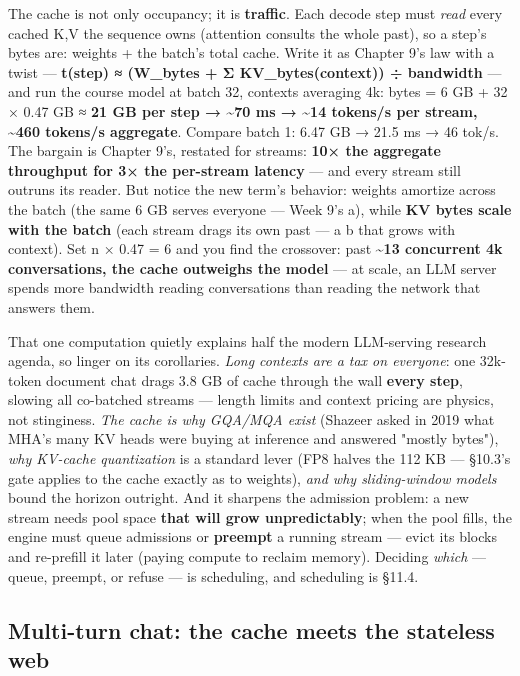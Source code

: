 The cache is not only occupancy; it is \textbf{traffic}. Each decode step must \textit{read} every cached K,V the sequence owns (attention consults the whole past), so a step's bytes are: weights + the batch's total cache. Write it as Chapter 9's law with a twist — \textbf{t(step) ≈ (W\_bytes + Σ KV\_bytes(context)) ÷ bandwidth} — and run the course model at batch 32, contexts averaging 4k: bytes = 6 GB + 32 × 0.47 GB ≈ \textbf{21 GB per step → \textasciitilde{}70 ms → \textasciitilde{}14 tokens/s per stream, \textasciitilde{}460 tokens/s aggregate}. Compare batch 1: 6.47 GB → 21.5 ms → 46 tok/s. The bargain is Chapter 9's, restated for streams: \textbf{10× the aggregate throughput for 3× the per-stream latency} — and every stream still outruns its reader. But notice the new term's behavior: weights amortize across the batch (the same 6 GB serves everyone — Week 9's a), while \textbf{KV bytes scale with the batch} (each stream drags its own past — a b that grows with context). Set n × 0.47 = 6 and you find the crossover: past \textbf{\textasciitilde{}13 concurrent 4k conversations, the cache outweighs the model} — at scale, an LLM server spends more bandwidth reading conversations than reading the network that answers them.

That one computation quietly explains half the modern LLM-serving research agenda, so linger on its corollaries. \textit{Long contexts are a tax on everyone}: one 32k-token document chat drags 3.8 GB of cache through the wall \textbf{every step}, slowing all co-batched streams — length limits and context pricing are physics, not stinginess. \textit{The cache is why GQA/MQA exist} (Shazeer asked in 2019 what MHA's many KV heads were buying at inference and answered "mostly bytes"), \textit{why KV-cache quantization} is a standard lever (FP8 halves the 112 KB — §10.3's gate applies to the cache exactly as to weights), \textit{and why sliding-window models} bound the horizon outright. And it sharpens the admission problem: a new stream needs pool space \textbf{that will grow unpredictably}; when the pool fills, the engine must queue admissions or \textbf{preempt} a running stream — evict its blocks and re-prefill it later (paying compute to reclaim memory). Deciding \textit{which} — queue, preempt, or refuse — is scheduling, and scheduling is §11.4.

\subsection*{Multi-turn chat: the cache meets the stateless web}

